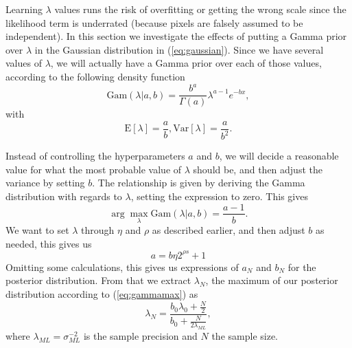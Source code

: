 \documentclass{report}
\begin{document}

Learning $\lambda$ values runs the risk of overfitting or getting the wrong scale since the likelihood term is underrated (because pixels are falsely assumed to be independent). In this section we investigate the effects of putting a Gamma prior over $\lambda$ in the Gaussian distribution in (\ref{eq:gaussian}). Since we have several values of $\lambda$, we will actually have a Gamma prior over each of those values, according to the following density function
\[
    \text{Gam}(\lambda|a,b) = \frac{b^{a}}{\Gamma(a)}\lambda^{a-1}e^{-b x},
\]
with
\[
    \text{E}[\lambda] = \frac{a}{b}, \text{Var}[\lambda] = \frac{a}{b^2}.
\]

Instead of controlling the hyperparameters $a$ and $b$, we will decide a reasonable value for what the most probable value of $\lambda$ should be, and then adjust the variance by setting $b$. The relationship is given by deriving the Gamma distribution with regards to $\lambda$, setting the expression to zero. This gives
\begin{equation} \label{eq:gammamax}
    \arg\max_{\lambda} \text{Gam}(\lambda|a, b) = \frac{a-1}{b}.
\end{equation}
We want to set $\lambda$ through $\eta$ and $\rho$ as described earlier, and then adjust $b$ as needed, this gives us
\[
    a = b \eta 2^{\rho s} + 1
\]
Omitting some calculations, this gives us expressions of $a_N$ and $b_N$ for the posterior distribution. From that we extract $\lambda_N$, the maximum of our posterior distribution according to (\ref{eq:gammamax}) as
\[
    \lambda_N = \frac{b_0 \lambda_0 + \frac{N}{2}}{b_0 + \frac{N}{2 \lambda_{ML}}},
\]
where $\lambda_{ML} = \sigma_{ML}^{-2}$ is the sample precision and $N$ the sample size.

\newcommand{\FT}{F$_\rightarrow $T}
\newcommand{\TF}{T$_\rightarrow $F}
\end{document}
